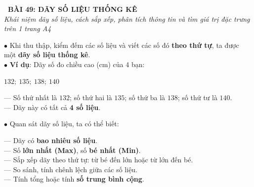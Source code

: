 \documentclass[14pt,a4paper,oneside]{extbook}
\begin{document}
\noindent
\begin{tcolorbox}[
  enhanced,
  colback=teal!8!white,
  colframe=teal!80!black,
  arc=3mm, boxrule=1pt,
  left=3mm, right=3mm, top=2mm, bottom=2mm,
  halign=center
]
  {\Large\bfseries\color{teal!90!black}\faBookmark\ BÀI 49: DÃY SỐ LIỆU THỐNG KÊ}\\[1.5pt]
  {\footnotesize\itshape\color{black!75} Khái niệm dãy số liệu, cách sắp xếp, phân tích thông tin và tìm giá trị đặc trưng trên 1 trang A4}
\end{tcolorbox}

\vspace{2mm}

\noindent
\begin{minipage}[t]{0.49\textwidth}
  \begin{tcolorbox}[
    enhanced,
    title={\footnotesize\bfseries\color{white}\faDatabase\ 1. Khái niệm dãy số liệu},
    colback=blue!2!white,
    colframe=blue!75!black,
    arc=2.5mm, boxrule=0.8pt, top=1.8mm, bottom=1.8mm, left=2mm, right=2mm
  ]
    \footnotesize
    $\bullet$ Khi thu thập, kiểm đếm các số liệu và viết các số đó \textbf{theo thứ tự}, ta được một \textbf{dãy số liệu thống kê}.\\
    $\bullet$ \textbf{Ví dụ}: Dãy số đo chiều cao (cm) của 4 bạn:\\
    \begin{center}
      $132;\ 135;\ 138;\ 140$
    \end{center}
    --- Số thứ nhất là $132$; số thứ hai là $135$; số thứ ba là $138$; số thứ tư là $140$.\\
    --- Dãy này có tất cả \textbf{4 số liệu}.
  \end{tcolorbox}
\end{minipage}%
\hfill
\begin{minipage}[t]{0.49\textwidth}
  \begin{tcolorbox}[
    enhanced,
    title={\footnotesize\bfseries\color{white}\faSearch\ 2. Khai thác thông tin từ dãy},
    colback=teal!2!white,
    colframe=teal!75!black,
    arc=2.5mm, boxrule=0.8pt, top=1.8mm, bottom=1.8mm, left=2mm, right=2mm
  ]
    \footnotesize
    $\bullet$ Quan sát dãy số liệu, ta có thể biết:
    \par
    --- Dãy có \textbf{bao nhiêu số liệu}.\\
    --- Số \textbf{lớn nhất (Max)}, số \textbf{bé nhất (Min)}.\\
    --- Sắp xếp dãy theo thứ tự: từ bé đến lớn hoặc từ lớn đến bé.\\
    --- So sánh, tính chênh lệch giữa các số liệu.\\
    --- Tính tổng hoặc tính \textbf{số trung bình cộng}.
  \end{tcolorbox}
\end{minipage}
\end{document}

